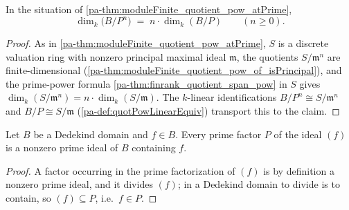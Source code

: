 \begin{theorem}
  \label{pa-thm:finrank_quotient_pow_atPrime}
  \leanok

  In the situation of \ref{pa-thm:moduleFinite_quotient_pow_atPrime},
  \[
    \dim_k\bigl(B/P^n\bigr) \;=\; n \cdot \dim_k(B/P)
    \qquad (n \ge 0).
  \]
\end{theorem}
\begin{proof}
  \leanok
  As in \ref{pa-thm:moduleFinite_quotient_pow_atPrime}, \(S\) is a discrete valuation
  ring with nonzero principal maximal ideal \(\mathfrak m\), the quotients
  \(S/\mathfrak m^n\) are finite-dimensional
  (\ref{pa-thm:moduleFinite_quotient_pow_of_isPrincipal}), and the prime-power formula
  \ref{pa-thm:finrank_quotient_span_pow} in \(S\) gives
  \(\dim_k(S/\mathfrak m^n) = n \cdot \dim_k(S/\mathfrak m)\). The \(k\)-linear
  identifications \(B/P^n \cong S/\mathfrak m^n\) and \(B/P \cong S/\mathfrak m\)
  (\ref{pa-def:quotPowLinearEquiv}) transport this to the claim.
\end{proof}

\begin{lemma}
  \label{pa-lem:prime_factor_span}
  \leanok

  Let \(B\) be a Dedekind domain and \(f \in B\). Every prime factor \(P\) of the
  ideal \((f)\) is a nonzero prime ideal of \(B\) containing \(f\).
\end{lemma}
\begin{proof}
  \leanok
  A factor occurring in the prime factorization of \((f)\) is by definition a nonzero
  prime ideal, and it divides \((f)\); in a Dedekind domain to divide is to contain,
  so \((f) \subseteq P\), i.e.\ \(f \in P\).
\end{proof}

